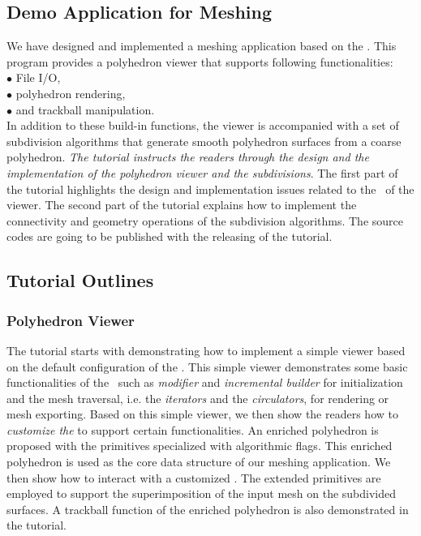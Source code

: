 \documentclass[letter]{article}
\begin{document}
\subsection*{Demo Application for Meshing}
We have designed and implemented a meshing application
based on the \cgalpoly . This program provides a
polyhedron viewer that supports following functionalities:\\
\indent $\bullet$ File I/O,\\
\indent $\bullet$ polyhedron rendering,\\ 
\indent $\bullet$ and trackball manipulation.\\
In addition to these build-in functions, the viewer 
is accompanied with a set of subdivision algorithms
that generate smooth polyhedron surfaces from
a coarse polyhedron. \emph{The tutorial  
instructs the readers through the design and the implementation 
of the polyhedron viewer and the subdivisions}. The first part of the 
tutorial highlights the design and implementation issues 
related to the \poly\ of the viewer. The second part
of the tutorial explains how to implement 
the connectivity and geometry operations of the 
subdivision algorithms. The source codes are going to 
be published with the releasing of the tutorial.

\subsection*{Tutorial Outlines}
\subsubsection*{Polyhedron Viewer}
The tutorial starts with demonstrating
how to implement a simple viewer based on the default
configuration of the \cgalpoly . This simple viewer 
demonstrates some basic functionalities of the \cgalpoly\ such as
\emph{modifier} and \emph{incremental builder} for initialization and 
the mesh traversal, i.e. the \emph{iterators} and the \emph{circulators},
for rendering or mesh exporting. Based on this simple
viewer, we then show the readers how to
\emph{customize the \poly} to support certain functionalities. 
An enriched polyhedron is proposed with the primitives 
specialized with algorithmic flags. This enriched polyhedron
is used as the core data structure of our meshing application.
We then show how to interact with a customized \poly . 
The extended primitives are employed to support the superimposition of the 
input mesh on the subdivided surfaces. A trackball function
of the enriched polyhedron is also demonstrated in the tutorial.
\end{document}
